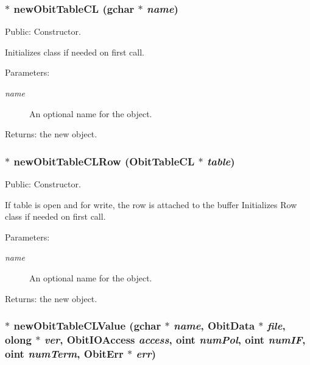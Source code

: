 \subsubsection{$\ast$ new\-Obit\-Table\-CL (gchar $\ast$ {\em name})}\label{ObitTableCL_8c_a16}


Public: Constructor. 

Initializes class if needed on first call. \begin{Desc}
\item[Parameters:]
\begin{description}
\item[{\em name}]An optional name for the object. \end{description}
\end{Desc}
\begin{Desc}
\item[Returns:]the new object. \end{Desc}
\subsubsection{$\ast$ new\-Obit\-Table\-CLRow ({\bf Obit\-Table\-CL} $\ast$ {\em table})}\label{ObitTableCL_8c_a14}


Public: Constructor. 

If table is open and for write, the row is attached to the buffer Initializes Row class if needed on first call. \begin{Desc}
\item[Parameters:]
\begin{description}
\item[{\em name}]An optional name for the object. \end{description}
\end{Desc}
\begin{Desc}
\item[Returns:]the new object. \end{Desc}
\subsubsection{$\ast$ new\-Obit\-Table\-CLValue (gchar $\ast$ {\em name}, {\bf Obit\-Data} $\ast$ {\em file}, {\bf olong} $\ast$ {\em ver}, Obit\-IOAccess {\em access}, {\bf oint} {\em num\-Pol}, {\bf oint} {\em num\-IF}, {\bf oint} {\em num\-Term}, {\bf Obit\-Err} $\ast$ {\em err})}\label{ObitTableCL_8c_a18}


